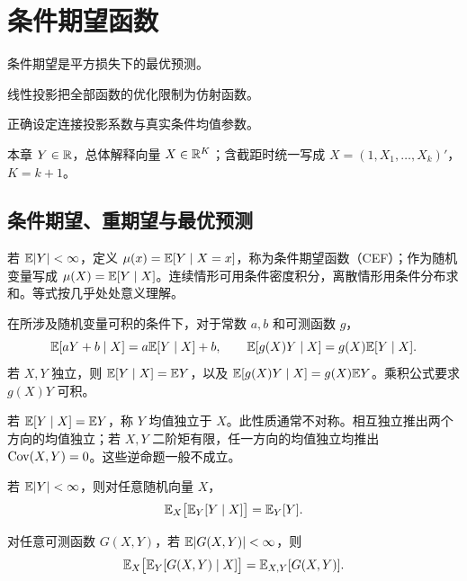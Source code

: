 \chapter{条件期望函数}

\begin{introduction}[本章的作用]
\item 条件期望是平方损失下的最优预测。
\item 线性投影把全部函数的优化限制为仿射函数。
\item 正确设定连接投影系数与真实条件均值参数。
\end{introduction}
本章 $Y\in\mathbb{R}$，总体解释向量 $X\in\mathbb{R}^K$；含截距时统一写成 $X=(1,X_1,\ldots,X_k)'$，$K=k+1$。
\section{条件期望、重期望与最优预测}

\begin{definition}[条件期望函数]\label{reg:entry:11}
若 $\mathbb{E}|Y|<\infty$，定义 $\mu(x)=\mathbb{E}[Y\mid X=x]$，称为条件期望函数（CEF）；作为随机变量写成 $\mu(X)=\mathbb{E}[Y\mid X]$。连续情形可用条件密度积分，离散情形用条件分布求和。等式按几乎处处意义理解。
\end{definition}

\begin{proposition}[条件期望的基本性质]\label{reg:entry:12}
在所涉及随机变量可积的条件下，对于常数 $a,b$ 和可测函数 $g$，
\[\mathbb{E}[aY+b\mid X]=a\mathbb{E}[Y\mid X]+b,\qquad \mathbb{E}[g(X)Y\mid X]=g(X)\mathbb{E}[Y\mid X].\]
若 $X,Y$ 独立，则 $\mathbb{E}[Y\mid X]=\mathbb{E} Y$，以及 $\mathbb{E}[g(X)Y\mid X]=g(X)\mathbb{E} Y$。乘积公式要求 $g(X)Y$ 可积。
\end{proposition}

\begin{definition}[均值独立]\label{reg:entry:13}
若 $\mathbb{E}[Y\mid X]=\mathbb{E} Y$，称 $Y$ 均值独立于 $X$。此性质通常不对称。相互独立推出两个方向的均值独立；若 $X,Y$ 二阶矩有限，任一方向的均值独立均推出 $\operatorname{Cov}(X,Y)=0$。这些逆命题一般不成立。
\end{definition}

\begin{theorem}[重期望公式 I]\label{reg:entry:14}
若 $\mathbb{E}|Y|<\infty$，则对任意随机向量 $X$，
\[\mathbb{E}_X\bigl[\mathbb{E}_Y[Y\mid X]\bigr]=\mathbb{E}_Y[Y].\]
\end{theorem}

\begin{theorem}[重期望公式 II]\label{reg:entry:15}
对任意可测函数 $G(X,Y)$，若 $\mathbb{E}|G(X,Y)|<\infty$，则
\[\mathbb{E}_X\bigl[\mathbb{E}_Y[G(X,Y)\mid X]\bigr]=\mathbb{E}_{X,Y}[G(X,Y)].\]
\end{theorem}

